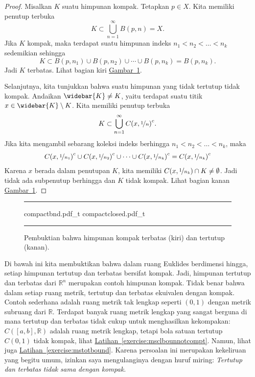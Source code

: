 \documentclass[12pt,openany]{book}
\newcommand{\R}{{\mathbb{R}}}
\theoremstyle{plain}
\theoremstyle{remark}
\theoremstyle{definition}
\newenvironment{myfig}{%
\begin{figure}[h!t]
\noindent\rule{\textwidth}{0.5pt}\vspace{12pt}\par\centering}%
{\par\noindent\rule{\textwidth}{0.5pt}
\end{figure}}
\theoremstyle{exercise}
\theoremstyle{example}
\newcommand{\figureref}[1]{\hyperref[#1]{Gambar~\ref*{#1}}}
\newcommand{\exerciseref}[1]{\hyperref[#1]{Latihan~\ref*{#1}}}
\begin{document}
\begin{proof}
Misalkan $K$ suatu himpunan kompak.
Tetapkan $p \in X$. Kita memiliki penutup terbuka
\begin{equation*}
K \subset \bigcup_{n=1}^\infty B(p,n) = X .
\end{equation*}
Jika $K$ kompak, maka terdapat suatu himpunan indeks
$n_1 < n_2 < \ldots < n_k$ sedemikian sehingga
\begin{equation*}
K \subset
B(p,n_1)
\cup
B(p,n_2)
\cup \cdots \cup
B(p,n_k)
= B(p,n_k) .
\end{equation*}
Jadi $K$ terbatas.
Lihat bagian kiri \figureref{fig:compactbndclosed}.

Selanjutnya, kita tunjukkan bahwa suatu himpunan yang tidak tertutup tidak kompak. Andaikan
$\widebar{K} \neq K$, yaitu terdapat suatu titik $x \in \widebar{K}
\setminus K$.
Kita memiliki penutup terbuka
\begin{equation*}
K \subset \bigcup_{n=1}^\infty {C(x,\nicefrac{1}{n})}^c .
\end{equation*}
Jika kita mengambil sebarang
koleksi indeks berhingga $n_1 < n_2 < \ldots < n_k$, maka
\begin{equation*}
{C(x,\nicefrac{1}{n_1})}^c
\cup
{C(x,\nicefrac{1}{n_2})}^c
\cup \cdots \cup
{C(x,\nicefrac{1}{n_k})}^c
=
{C(x,\nicefrac{1}{n_k})}^c
\end{equation*}
Karena $x$ berada dalam penutupan $K$,
kita memiliki
$C(x,\nicefrac{1}{n_k}) \cap K \neq \emptyset$. Jadi tidak ada
subpenutup berhingga dan $K$ tidak kompak.
Lihat bagian kanan \figureref{fig:compactbndclosed}.
\end{proof}

\begin{myfig}
{compactbnd.pdf_t}
\qquad \qquad
{compactclosed.pdf_t}
\caption{Pembuktian bahwa himpunan kompak terbatas (kiri) dan tertutup (kanan).\label{fig:compactbndclosed}}
\end{myfig}

Di bawah ini kita membuktikan bahwa
dalam ruang Euklides berdimensi hingga,
setiap himpunan tertutup dan terbatas bersifat kompak.
Jadi, himpunan tertutup dan terbatas
dari $\R^n$ merupakan contoh himpunan kompak.
Tidak benar bahwa dalam setiap ruang metrik, tertutup dan terbatas ekuivalen
dengan kompak. Contoh sederhana adalah ruang metrik tak lengkap seperti
$(0,1)$ dengan metrik subruang dari $\R$.
Terdapat banyak ruang metrik lengkap yang sangat berguna
di mana tertutup dan terbatas tidak
cukup untuk menghasilkan kekompakan: $C([a,b],\R)$ adalah ruang metrik lengkap,
tetapi bola satuan tertutup $C(0,1)$ tidak kompak, lihat
\exerciseref{exercise:msclbounnotcompt}. Namun, lihat juga
\exerciseref{exercise:mstotbound}. Karena persoalan ini merupakan kekeliruan yang begitu umum, izinkan saya
mengulanginya dengan huruf miring: \emph{Tertutup dan terbatas tidak sama dengan kompak.}
\end{document}
